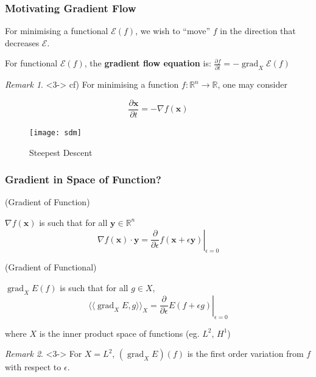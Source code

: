 \documentclass{beamer}
\theoremstyle{remark}
\newtheorem{remark}{Remark}
\newcommand{\xbf}{\mathbf{x}}
\newcommand{\ybf}{\mathbf{y}}
\newcommand{\inner}[1]{\langle \langle #1 \rangle \rangle}
\DeclareMathOperator{\grad}{grad}
\begin{document}
\begin{frame}
    \frametitle{Motivating Gradient Flow}
    For minimising a functional $\mathcal{E}(f)$, we wish to ``move'' $f$ in the direction that decreases $\mathcal{E}$.
    {
        \begin{definition}
            For functional $\mathcal{E} (f)$, the \textbf{gradient flow equation} is:
            $\frac{\partial f}{\partial t} = - \grad_X \mathcal{E} \left( f \right)$
        \end{definition}
    }
    \begin{remark}<3->
    cf) For minimising a function $f:\mathbb{R}^n \rightarrow \mathbb{R}$, one may consider
    \begin{multicols}{2}
        \begin{equation*}
            \frac{\partial \xbf}{\partial t} = - \nabla f \left( \xbf \right)
        \end{equation*}
        \columnbreak
        \begin{figure}[h]
            \centering
            \texttt{[image: sdm]}
            \caption{Steepest Descent \cite{doi:10.1137/1.9781611974997.ch8}}
        \end{figure}
    \end{multicols}
    \end{remark}
\end{frame}

\begin{frame}
    \frametitle{Gradient in Space of Function?}

    \begin{multicols}{2}
        {
            (Gradient of Function)

            $\nabla f\left( \xbf \right)$ is such that
            for all $\ybf \in \mathbb{R}^n$
            \begin{equation*}
                \left.\nabla f \left( \xbf \right) \cdot \ybf = \frac{\partial}{\partial \epsilon} f \left( \xbf + \epsilon \ybf \right)\right|_{\epsilon = 0}
                \end{equation*}
            }
        \columnbreak

        {
            (Gradient of Functional)

            $\grad_X E \left( f \right)$ is such that
            for all $g \in X$,
            \begin{equation*}
                \left.\inner{\grad_X E, g}_X = \frac{\partial}{\partial \epsilon} E \left( f + \epsilon g \right)\right|_{\epsilon = 0}
                \end{equation*}
            }
    \end{multicols}
    {
        where $X$ is the inner product space of functions (eg. $L^2$, $H^1$)
    }
    \begin{remark}<3->
        For $X=L^2$, $\left( \grad_X E\right) (f)$ is the first order variation from $f$ with respect to $\epsilon$.
    \end{remark}
\end{frame}
\end{document}
